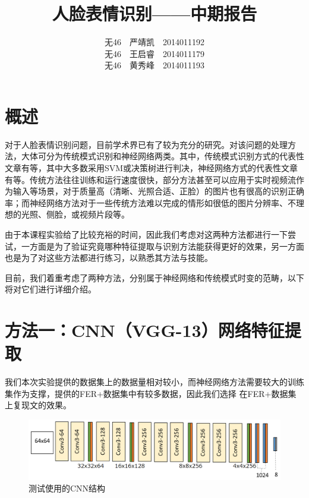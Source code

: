\documentclass[UTF8]{ctexart}
\begin{document}
\title{人脸表情识别——中期报告}
\author{无46\ \ 严靖凯\ \ 2014011192\\ 无46\ \ 王启睿\ \ 2014011179\\ 无46\ \ 黄秀峰\ \ 2014011193}
\maketitle

\section{概述}


对于人脸表情识别问题，目前学术界已有了较为充分的研究。对该问题的处理方法，大体可分为传统模式识别和神经网络两类。其中，传统模式识别方式的代表性文章有\cite{happy2015automatic,islam2016sention,wang2013feature,salmam2016facial}等，其中大多数采用SVM或决策树进行判决，神经网络方式的代表性文章有\cite{BarsoumICMI2016,khorrami2015deep}等。传统方法往往训练和运行速度很快，部分方法甚至可以应用于实时视频流作为输入等场景，对于质量高（清晰、光照合适、正脸）的图片也有很高的识别正确率；而神经网络方法对于一些传统方法难以完成的情形如很低的图片分辨率、不理想的光照、侧脸，或视频片段等。

由于本课程实验给了比较充裕的时间，因此我们考虑对这两种方法都进行一下尝试，一方面是为了验证究竟哪种特征提取与识别方法能获得更好的效果，另一方面也是为了对这些方法都进行练习，以熟悉其方法与技能。

目前，我们着重考虑了两种方法，分别属于神经网络和传统模式时变的范畴，以下将对它们进行详细介绍。

\section{方法一：CNN（VGG-13）网络特征提取}

我们本次实验提供的数据集上的数据量相对较小，而神经网络方法需要较大的训练集作为支撑，\cite{BarsoumICMI2016}提供的FER+数据集中有较多数据，因此我们选择%
在FER+数据集上复现文\cite{BarsoumICMI2016}的效果。

\begin{figure}[ht]
\includegraphics[width=\textwidth]{ferplus.png}
\caption{测试使用的CNN结构}\label{fig:ferplus}
\end{figure}
\end{document}
